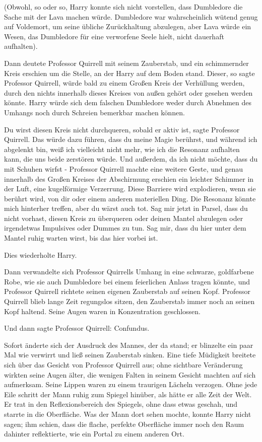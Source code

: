 (Obwohl, so oder so, Harry konnte sich nicht vorstellen, dass Dumbledore die
Sache mit der Lava machen würde. Dumbledore war wahrscheinlich wütend genug auf
Voldemort, um seine übliche Zurückhaltung abzulegen, aber Lava würde ein Wesen,
das Dumbledore für eine verworfene Seele hielt, nicht dauerhaft aufhalten).

Dann deutete Professor Quirrell mit seinem Zauberstab, und ein schimmernder
Kreis erschien um die Stelle, an der Harry auf dem Boden stand. Dieser, so sagte
Professor Quirrell, würde bald zu einem Großen Kreis der Verhüllung werden,
durch den nichts innerhalb dieses Kreises von außen gehört oder gesehen werden
könnte. Harry würde sich dem falschen Dumbledore weder durch Abnehmen des
Umhangs noch durch Schreien bemerkbar machen können.

\glqq{}Du wirst diesen Kreis nicht durchqueren, sobald er aktiv ist\grqq{}, sagte
Professor Quirrell. \glqq{}Das würde dazu führen, dass du meine Magie berührst,
und während ich abgelenkt bin, weiß ich vielleicht nicht mehr, wie ich die
Resonanz aufhalten kann, die uns beide zerstören würde. Und außerdem, da ich
nicht möchte, dass du mit Schuhen wirfst -\grqq{} Professor Quirrell machte eine
weitere Geste, und genau innerhalb des Großen Kreises der Abschirmung erschien
ein leichter Schimmer in der Luft, eine kugelförmige Verzerrung. \glqq{}Diese
Barriere wird explodieren, wenn sie berührt wird, von dir oder einem anderen
materiellen Ding. Die Resonanz könnte mich hinterher treffen, aber du wärst auch
tot. Sag mir jetzt in Parsel, dass du nicht vorhast, diesen Kreis zu überqueren
oder deinen Mantel abzulegen oder irgendetwas Impulsives oder Dummes zu tun. Sag
mir, dass du hier unter dem Mantel ruhig warten wirst, bis das hier vorbei
ist.\grqq{}

Dies wiederholte Harry.

Dann verwandelte sich Professor Quirrells Umhang in eine schwarze, goldfarbene
Robe, wie sie auch Dumbledore bei einem feierlichen Anlass tragen könnte, und
Professor Quirrell richtete seinen eigenen Zauberstab auf seinen Kopf. Professor
Quirrell blieb lange Zeit regungslos sitzen, den Zauberstab immer noch an seinen
Kopf haltend. Seine Augen waren in Konzentration geschlossen.

Und dann sagte Professor Quirrell: \glqq{}Confundus.\grqq{}

Sofort änderte sich der Ausdruck des Mannes, der da stand; er blinzelte ein paar
Mal wie verwirrt und ließ seinen Zauberstab sinken. Eine tiefe Müdigkeit
breitete sich über das Gesicht von Professor Quirrell aus; ohne sichtbare
Veränderung wirkten seine Augen älter, die wenigen Falten in seinem Gesicht
machten auf sich aufmerksam. Seine Lippen waren zu einem traurigen Lächeln
verzogen. Ohne jede Eile schritt der Mann ruhig zum Spiegel hinüber, als hätte
er alle Zeit der Welt. Er trat in den Reflexionsbereich des Spiegels, ohne dass
etwas geschah, und starrte in die Oberfläche. Was der Mann dort sehen mochte,
konnte Harry nicht sagen; ihm schien, dass die flache, perfekte Oberfläche immer
noch den Raum dahinter reflektierte, wie ein Portal zu einem anderen Ort.

